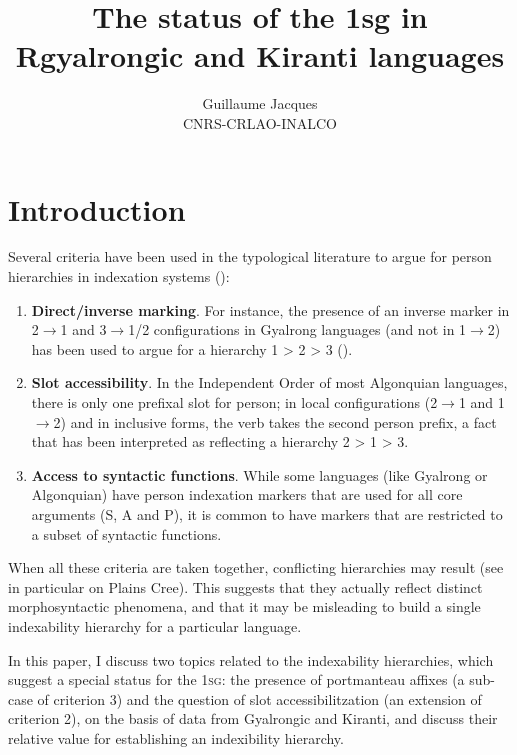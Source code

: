\documentclass{article}
\begin{document}
 
\title{The status of the 1sg in Rgyalrongic and Kiranti
languages}
\author{Guillaume Jacques\\ CNRS-CRLAO-INALCO}
\maketitle

\sloppy
\section*{Introduction}
Several criteria have been used in the typological literature to argue for person hierarchies in indexation systems (\citealt[27]{zuniga06}):

\begin{enumerate}
\item \textbf{Direct/inverse marking}. For instance, the presence of an inverse marker in 2$\rightarrow$1 and 3$\rightarrow$1/2 configurations in Gyalrong languages (and not in 1$\rightarrow$2) has been used to argue for a hierarchy 1 > 2 > 3 (\citealt{delancey81direction, jackson02rentongdengdi}).
\item \textbf{Slot accessibility}. In the Independent Order of most Algonquian languages, there is only one prefixal slot for person; in local configurations (2$\rightarrow$1 and 1$\rightarrow$2) and in inclusive forms, the verb takes the second person prefix, a fact that has been interpreted as reflecting a hierarchy 2 > 1 > 3.
\item \textbf{Access to syntactic functions}. While some languages (like Gyalrong or Algonquian) have person indexation markers that are used for all core arguments (S, A and P), it is common to have markers that are restricted to a subset of syntactic functions.
\end{enumerate}
When all these criteria are taken together, conflicting hierarchies may result (see in particular \citealt[85-6]{zuniga06} on Plains Cree). This suggests that they actually reflect distinct morphosyntactic phenomena, and that it may be misleading to build a single indexability hierarchy for a particular language.

In this paper, I discuss two topics related to the indexability hierarchies, which suggest a special status for the \textsc{1sg}: the presence of portmanteau affixes (a sub-case of criterion 3) and the question of slot accessibilitzation (an extension of criterion 2), on the basis of data from Gyalrongic and Kiranti, and discuss their relative value for establishing an indexibility hierarchy.
\end{document}
